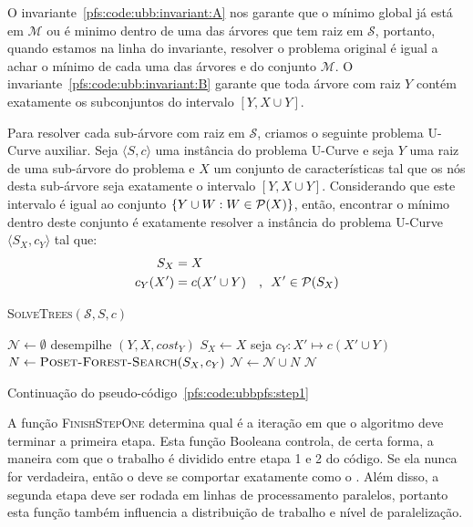 O invariante~\ref{pfs:code:ubb:invariant:A} nos garante que o mínimo
global já está em $\mathcal{M}$ ou é minimo dentro de uma das árvores
que tem raiz em $\mathcal{S}$, portanto, quando estamos na linha do 
invariante, resolver o problema original é igual a achar o mínimo
de cada uma das árvores e do conjunto $\mathcal{M}$. O 
invariante~\ref{pfs:code:ubb:invariant:B} garante que toda árvore com 
raiz $Y$ contém exatamente os subconjuntos do intervalo $[Y, X \cup Y]$. 

Para resolver cada sub-árvore com raiz em $\mathcal{S}$, criamos o 
seguinte problema U-Curve auxiliar. Seja $\langle S, c \rangle$ uma 
instância do problema U-Curve e seja $Y$ uma raiz de uma sub-árvore do 
problema e $X$ um conjunto de características tal que os nós desta 
sub-árvore seja exatamente o intervalo $[Y, X \cup Y]$. Considerando que
este intervalo é igual ao conjunto $\{Y \cup W : W \in \mathcal{P}(X)\}$,
então, encontrar o mínimo dentro deste conjunto é exatamente resolver a 
instância do problema U-Curve $\langle S_X, c_Y\rangle$ tal que:
\begin{alignat*}{2}
    S_X      & = X & \\
    c_Y (X') & = c (X' \cup Y) & \text{, } ~X' \in \mathcal{P}(S_X) \\
\end{alignat*}

\begin{algorithm}[!ht]
\textsc{SolveTrees}$(\mathcal{S}, S, c)$
\begin{algorithmic}[1]
    \State $\mathcal{N} \gets \emptyset$
        \State desempilhe $(Y, X, cost_Y)$
        \State $S_X \gets X$
        \State seja $c_Y: X' \mapsto c (X' \cup Y)$
        \State $N \gets {\normalfont\textsc{Poset-Forest-Search}} (S_X, c_Y)$
        \State $\mathcal{N} \gets \mathcal{N} \cup N$
    \EndWhile
    \Return $\mathcal{N}$
\end{algorithmic}
\caption{Continuação do pseudo-código~\ref{pfs:code:ubbpfs:step1}}
\end{algorithm}

A função \textsc{FinishStepOne} determina qual é a iteração em que o
algoritmo deve terminar a primeira etapa. Esta função Booleana controla,
de certa forma, a maneira com que o trabalho é dividido entre etapa 1 e 
2 do código. Se ela nunca for verdadeira, então o  deve 
se comportar exatamente como o . Além disso, a segunda 
etapa deve ser rodada em linhas de processamento paralelos, portanto
esta função também influencia a distribuição de trabalho e nível de 
paralelização.

